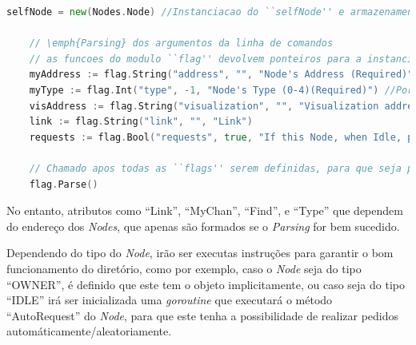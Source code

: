 \begin{lstlisting}[caption={\emph{Parsing} dos argumentos da linha de comandos.},language=Go]
	selfNode = new(Nodes.Node) //Instanciacao do ``selfNode'' e armazenamento do ponteiro para o mesmo

	// \emph{Parsing} dos argumentos da linha de comandos
	// as funcoes do modulo ``flag'' devolvem ponteiros para a instanciacao de cada argumento \emph{Parsed}
	myAddress := flag.String("address", "", "Node's Address (Required)")
	myType := flag.Int("type", -1, "Node's Type (0-4)(Required)") //Por definicao de todos os tipos
	visAddress := flag.String("visualization", "", "Visualization address.")
	link := flag.String("link", "", "Link")
	requests := flag.Bool("requests", true, "If this Node, when Idle, preforms Object Requests")

	// Chamado apos todas as ``flags'' serem definidas, para que seja processado o \emph{Parsing}
	flag.Parse()

\end{lstlisting}

No entanto, atributos como ``Link'', ``MyChan'', ``Find'', e ``Type'' que dependem do endereço dos \emph{Nodes},
que apenas são formados se o \emph{Parsing} for bem sucedido.

Dependendo do tipo do \emph{Node}, irão ser executas instruções para garantir o bom funcionamento do diretório,
como por exemplo, caso o \emph{Node} seja do tipo ``OWNER'', é definido que este tem o objeto implicitamente, ou
caso seja do tipo ``IDLE'' irá ser inicializada uma \emph{goroutine} que executará o método ``AutoRequest'' do \emph{Node},
para que este tenha a possibilidade de realizar pedidos automáticamente/aleatoriamente.

